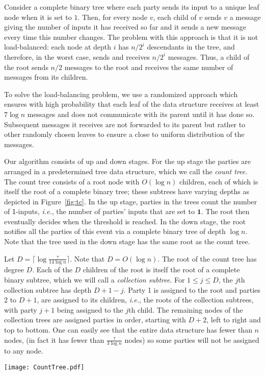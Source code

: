 \documentclass[11pt,letter]{article}
\newcommand{\ie}{\emph{i.e.}}
\theoremstyle{mytheoremstyle}
\let\savedCaption=\caption
\renewcommand*{\caption}[1]{\savedCaption[#1]{~#1}}
\newcommand{\dcl}{D}
\newcommand{\oneinputs}{$\mathsf{1}$-inputs\xspace}
\newcommand{\ct}{count tree\xspace}
\begin{document}
Consider a complete binary tree where each party sends its input to a unique leaf node when it is set to $1$. Then, for every node $v$, each child of $v$ sends $v$ a message giving the number of inputs it has received so far and it sends a new message every time this number changes. The problem with this approach is that it is not load-balanced: each node at depth $i$ has $n/2^i$ descendants in the tree, and therefore, in the worst case, sends and receives $n/2^i$ messages. Thus, a child of the root sends $n/2$ messages to the root and receives the same number of messages from its children. 

To solve the load-balancing problem, we use a randomized approach which ensures with high probability that each leaf of the data structure receives at least $7\log n$ messages and does not communicate with its parent until it has done so. Subsequent messages it receives are not forwarded to its parent but rather to other randomly chosen leaves to ensure a close to uniform distribution of the messages.	

Our algorithm consists of up and down stages. For the up stage the parties are arranged in a predetermined tree data structure, which we call the \emph{\ct.} The \ct consists of a root node with $O(\log{n})$ children, each of which is itself the root of a complete binary tree; these subtrees have varying depths as depicted in Figure~\ref{fig:tc}. In the up stage, parties in the trees count the number of \oneinputs, \ie, the number of parties' inputs that are set to $\mathbf{1}$. The root then eventually decides when the threshold is reached. In the down stage, the root notifies all the parties of this event via a complete binary tree of depth $\log n$. Note that the tree used in the down stage has the same root as the \ct.

Let $\dcl = \lceil \log{\frac{\tau}{14\log{n}}}\rceil$. Note that $\dcl = O(\log{n})$. The root of the \ct has degree $\dcl$. Each of the $\dcl$ children of the root is itself the root of a complete binary subtree, which we will call a \emph{collection subtree}. For $1\le j\le \dcl$, the $j$th collection subtree has depth $\dcl+1-j$. Party 1 is assigned to the root and parties 2 to $\dcl+1$, are assigned to its children, \ie, the roots of the collection subtrees, with party $j+1$ being assigned to the $j$th child. The remaining nodes of the collection trees are assigned parties in order, starting with $\dcl+2$, left to right and top to bottom. One can easily see that the entire data structure has fewer than $n$ nodes, (in fact it has fewer than $\frac{\tau}{3\log{n}}$ nodes) so some parties will not be assigned to any node.
\begin{figure*}[t]
	\begin{center}
		\texttt{[image: CountTree.pdf]}
	\end{center}
	\caption{The \ct for $n=2048$ and $\tau=1232$. $\dcl = \lceil \log{\frac{1232}{14 \times 11}}\rceil = 3$. The node marked $R$ is the root, nodes marked $A$ are adding nodes, and nodes marked $C$ are collection nodes.}
	\label{fig:tc}
\end{figure*}
\end{document}
